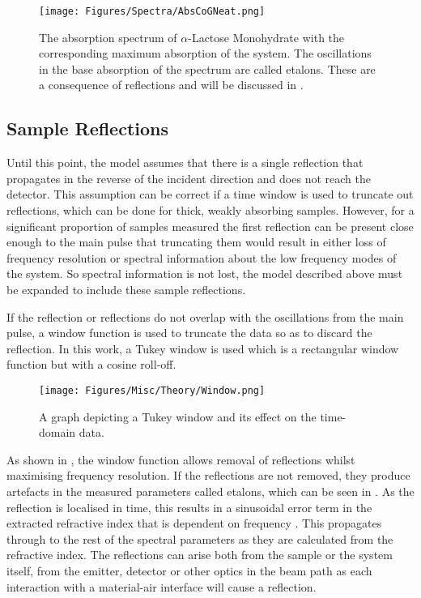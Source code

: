 \begin{figure}
    \centering
    \texttt{[image: Figures/Spectra/AbsCoGNeat.png]}
    \captionsetup{font = footnotesize, justification = centering}
    \caption[The Absorption Spectrum of \(\alpha\)-Lactose Monohydrate with the corresponding Maximum Absorption of the System]{The absorption spectrum of \(\alpha\)-Lactose Monohydrate with the corresponding maximum absorption of the system. The oscillations in the base absorption of the spectrum are called etalons. These are a consequence of reflections and will be discussed in .}
    \label{fig:my_absconeat}
\end{figure}

\subsection{Sample Reflections}
\label{subsec:Reflections}
Until this point, the model assumes that there is a single reflection that propagates in the reverse of the incident direction and does not reach the detector. This assumption can be correct if a time window is used to truncate out reflections, which can be done for thick, weakly absorbing samples. However, for a significant proportion of samples measured the first reflection can be present close enough to the main pulse that truncating them would result in either loss of frequency resolution or spectral information about the low frequency modes of the system. So spectral information is not lost, the model described above must be expanded to include these sample reflections.

If the reflection or reflections do not overlap with the oscillations from the main pulse, a window function is used to truncate the data so as to discard the reflection.  In this work, a Tukey window is used which is a rectangular window function but with a cosine roll-off.

\begin{figure}
    \centering
    \texttt{[image: Figures/Misc/Theory/Window.png]}
    \captionsetup{font = footnotesize, justification = centering}
    \caption[A Graph depicting a Tukey Window and its Effect on the Time-Domain Data]{A graph depicting a Tukey window and its effect on the time-domain data.}
    \label{fig:window}
\end{figure}

As shown in , the window function allows removal of reflections whilst maximising frequency resolution. If the reflections are not removed, they produce artefacts in the measured parameters called etalons, which can be seen in . As the reflection is localised in time, this results in a sinusoidal error term in the extracted refractive index that is dependent on frequency \DIFdelbegin \DIFdel{~}\DIFdelend \cite{Greenall2017}. This propagates through to the rest of the spectral parameters as they are calculated from the refractive index.
The reflections can arise both from the sample or the system itself, from the emitter, detector or other optics in the beam path as each interaction with a material-air interface will cause a reflection.

